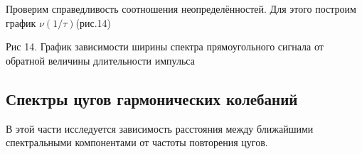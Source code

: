 \documentclass[a4paper,12pt]{article} %
\begin{document}
Проверим справедливость соотношения неопределённостей. Для этого построим график $\nu(1/\tau)$(рис.14)

\begin{center}
                    \begin{center}
                    {Рис 14.} График зависимости ширины спектра прямоугольного сигнала от обратной величины длительности импульса\\
                    \end{center}
                \end{center}

\subsection{Спектры цугов гармонических колебаний}

В этой части исследуется зависимость расстояния между ближайшими спектральными компонентами от частоты повторения цугов.
\end{document}
